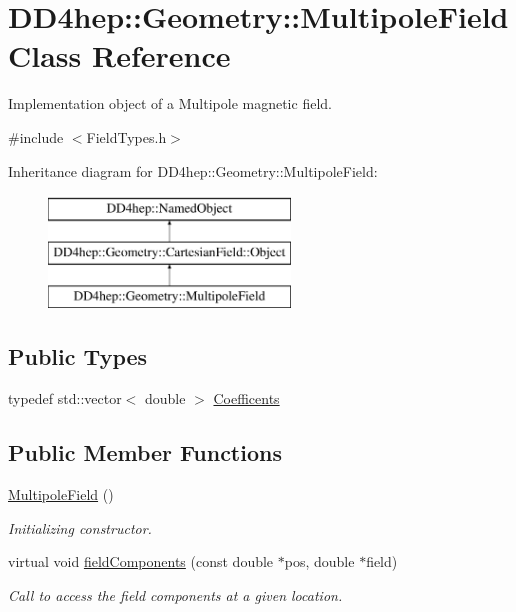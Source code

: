 \hypertarget{class_d_d4hep_1_1_geometry_1_1_multipole_field}{}\section{D\+D4hep\+:\+:Geometry\+:\+:Multipole\+Field Class Reference}
\label{class_d_d4hep_1_1_geometry_1_1_multipole_field}


Implementation object of a Multipole magnetic field.  




{\ttfamily \#include $<$Field\+Types.\+h$>$}

Inheritance diagram for D\+D4hep\+:\+:Geometry\+:\+:Multipole\+Field\+:\begin{figure}[H]
\begin{center}
\leavevmode
\includegraphics[height=3.000000cm]{class_d_d4hep_1_1_geometry_1_1_multipole_field}
\end{center}
\end{figure}
\subsection*{Public Types}
\begin{DoxyCompactItemize}
\item 
typedef std\+::vector$<$ double $>$ \hyperlink{class_d_d4hep_1_1_geometry_1_1_multipole_field_a760b1b7561c93dd8438ea523cbc660bc}{Coefficents}
\end{DoxyCompactItemize}
\subsection*{Public Member Functions}
\begin{DoxyCompactItemize}
\item 
\hyperlink{class_d_d4hep_1_1_geometry_1_1_multipole_field_a66745189fa088d26122bbf841eb18f90}{Multipole\+Field} ()
\begin{DoxyCompactList}\small\item\em Initializing constructor. \end{DoxyCompactList}\item 
virtual void \hyperlink{class_d_d4hep_1_1_geometry_1_1_multipole_field_a06782e6f0fbdfcf53394ee5dda83b052}{field\+Components} (const double $\ast$pos, double $\ast$field)
\begin{DoxyCompactList}\small\item\em Call to access the field components at a given location. \end{DoxyCompactList}\end{DoxyCompactItemize}
